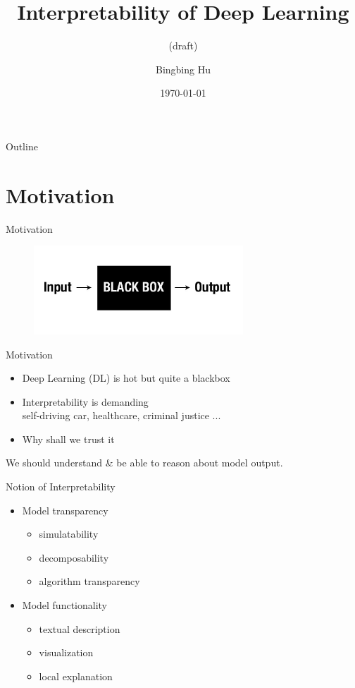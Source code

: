 \documentclass[xcolor={svgnames}]{beamer}
\title{Interpretability of Deep Learning}
\subtitle{(draft)}
\author{Bingbing Hu}
\institute{SIST, ShanghaiTech}
\date{\today}
\begin{document}

\begin{frame}{Outline}
\tableofcontents
\end{frame}

\section{Motivation}

\begin{frame}{Motivation}
	\begin{figure}[htbp]
		\centering
		\includegraphics[width=0.7\textwidth]{figures/blackbox.jpg}
	\end{figure}
\end{frame}
\begin{frame}{Motivation}
	\begin{itemize}
		\item Deep Learning (DL) is hot but quite a blackbox
		\item Interpretability is demanding \\
			self-driving car, healthcare, criminal justice ...
		\item Why shall we trust it
	\end{itemize}
	We should understand \& be able to reason about model output.
\end{frame}
\begin{frame}{Notion of Interpretability}
	\begin{itemize}
			\item Model transparency
				\begin{itemize}
						\item simulatability
						\item decomposability
						\item algorithm transparency
				\end{itemize}
			\item Model functionality
				\begin{itemize}
						\item textual description
						\item visualization
						\item local explanation
				\end{itemize}			
	\end{itemize}
\end{frame}
\end{document}
